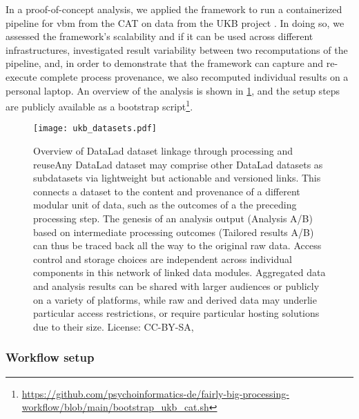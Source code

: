 In a proof-of-concept analysis, we applied the framework to run a containerized pipeline for \gls{vbm} \citep{ashburner2000voxel} from the \gls{CAT} \citep{gaser} on data from the UKB project \citep[][comprising 76 TB in 43 million files under strict usage constraints]{matthews2015uk}.
In doing so, we assessed the framework's scalability and if it can be used across different infrastructures, investigated result variability between two recomputations of the pipeline, and, in order to demonstrate that the framework can capture and re-execute complete process provenance, we also recomputed individual results on a personal laptop.
An overview of the analysis is shown in \cref{fig:fairly_datasets}, and the setup steps are publicly available as a bootstrap script\footnote{\url{https://github.com/psychoinformatics-de/fairly-big-processing-workflow/blob/main/bootstrap_ukb_cat.sh}}.

\begin{figure}
	\centering
	\texttt{[image: ukb\_datasets.pdf]}
	\caption[FAIRly big: Overview of the proof-of-concept analysis]{ Overview of DataLad dataset linkage through processing and reuseAny DataLad dataset may comprise other DataLad datasets as subdatasets via lightweight but actionable and versioned links. This connects a dataset to the content and provenance of a different modular unit of data, such as the outcomes of a the preceding processing step. The genesis of an analysis output (Analysis A/B) based on intermediate processing outcomes (Tailored results A/B) can thus be traced back all the way to the original raw data. Access control and storage choices are independent across individual components in this network of linked data modules. Aggregated data and analysis results can be shared with larger audiences or publicly on a variety of platforms, while raw and derived data may underlie particular access restrictions, or require particular hosting solutions due to their size. License: CC-BY-SA, \citet{wagner2022fairly}}
	\label{fig:fairly_datasets}
\end{figure}

\subsubsection{Workflow setup}

